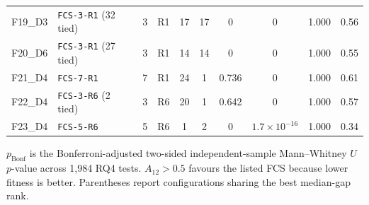 \begin{table}[H]
\begin{tabular}{llcccccccc}
F19\_D3 & \texttt{FCS-3-R1} (32 tied) & 3 & R1 & 17 & 17 & 0 & 0 & 1.000 & 0.56 \\
F20\_D6 & \texttt{FCS-3-R1} (27 tied) & 3 & R1 & 14 & 14 & 0 & 0 & 1.000 & 0.55 \\
F21\_D4 & \texttt{FCS-7-R1} & 7 & R1 & 24 & 1 & 0.736 & 0 & 1.000 & 0.61 \\
F22\_D4 & \texttt{FCS-3-R6} (2 tied) & 3 & R6 & 20 & 1 & 0.642 & 0 & 1.000 & 0.57 \\
F23\_D4 & \texttt{FCS-5-R6} & 5 & R6 & 1 & 2 & 0 & $1.7\!\times10^{-16}$ & 1.000 & 0.34 \\
\bottomrule
\end{tabular}
\par\smallskip
{\raggedright\footnotesize
$p_{\mathrm{Bonf}}$ is the Bonferroni-adjusted two-sided independent-sample Mann--Whitney $U$ $p$-value across 1,984 RQ4 tests. $A_{12}>0.5$ favours the listed FCS because lower fitness is better. Parentheses report configurations sharing the best median-gap rank.\par}
\end{table}

